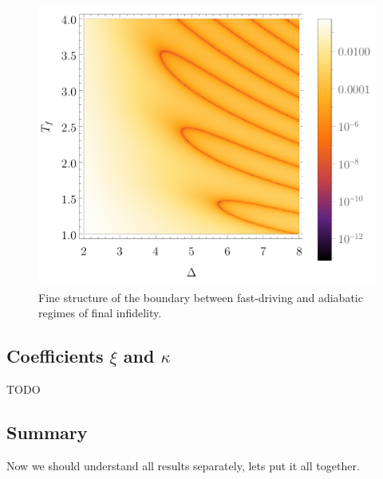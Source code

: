 \begin{figure}[H]
    \centering 
    \includegraphics[scale=1.2]{../img/dens2Zoom.pdf}
    \caption{Fine structure of the boundary between fast-driving and adiabatic regimes of final infidelity.}
    \label{fig:dens2Zoom}
\end{figure}


\subsection{Coefficients $\xi$ and $\kappa$}
TODO

\subsection{Summary}
Now we should understand all results separately, lets put it all together.

